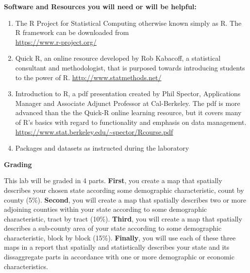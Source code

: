 \documentclass{article}
\begin{document}

\large{\textbf{Software and Resources you will need or will be helpful:}}

\begin{enumerate}[leftmargin=15mm]

\item The R Project for Statistical Computing otherwise known simply as R.  The R framework can be downloaded from \\ 
\url{https://www.r-project.org/}

\item Quick R, an online resource developed by Rob Kabacoff, a statistical consultant and methodologist, that is purposed towards introducing students to the power of R.  
\url{http://www.statmethods.net/}

\item Introduction to R, a pdf presentation created by Phil Spector, Applications Manager and Associate Adjunct Professor at Cal-Berkeley.  The pdf is more advanced than the the Quick-R online learning resource, but it covers many of R's basics with regard to functionality and emphasis on data management. \\ 
\url{https://www.stat.berkeley.edu/~spector/Rcourse.pdf}




\item Packages and datasets as instructed during the laboratory

\end{enumerate}


\newpage

\textbf{Grading}

\vspace{4mm}

\setlength{\leftskip}{1cm}

\setlength{\parindent}{0cm}

This lab will be graded in 4 parts.  \textbf{First}, you create a map that spatially describes your chosen state according some demographic characteristic, count by county (5\%).  \textbf{Second}, you will create a map that spatially describes two or more adjoining counties within your state according to some demographic characteristic, tract by tract (10\%).  \textbf{Third}, you will create a map that spatially describes a sub-county area of your state according to some demographic characteristic, block by block (15\%).  \textbf{Finally}, you will use each of these three maps in a report that spatially and statistically describes your state and its dissaggregate parts in accordance with one or more demographic or economic characteristics.  \\
\end{document}
